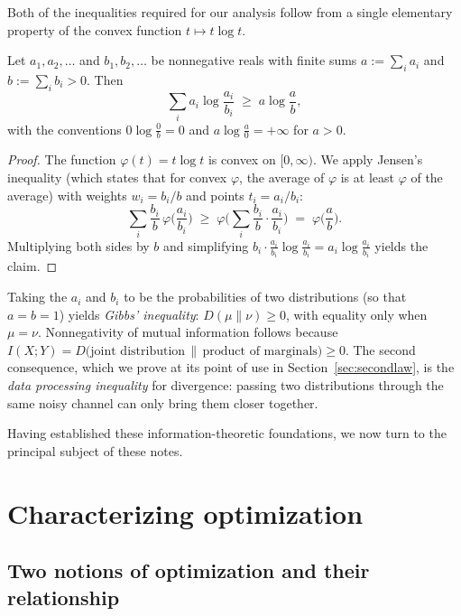 \documentclass[11pt]{article}
\begin{document}
Both of the inequalities required for our analysis follow from a single elementary property of the convex function $t \mapsto t \log t$.

\begin{lemma}
\label{lem:logsum}
Let $a_1, a_2, \dots$ and $b_1, b_2, \dots$ be nonnegative reals with finite sums $a := \sum_i a_i$ and $b := \sum_i b_i > 0$. Then
\[
\sum_i a_i \log \frac{a_i}{b_i} \;\ge\; a \log \frac{a}{b},
\]
with the conventions $0 \log \frac{0}{b} = 0$ and $a \log \frac{a}{0} = +\infty$ for $a > 0$.
\end{lemma}

\begin{proof}
The function $\varphi(t) = t \log t$ is convex on $[0, \infty)$. We apply Jensen's inequality (which states that for convex $\varphi$, the average of $\varphi$ is at least $\varphi$ of the average) with weights $w_i = b_i / b$ and points $t_i = a_i / b_i$:
\[
\sum_i \frac{b_i}{b}\, \varphi\!\Big(\frac{a_i}{b_i}\Big) \;\ge\; \varphi\!\Big(\sum_i \frac{b_i}{b} \cdot \frac{a_i}{b_i}\Big) \;=\; \varphi\!\Big(\frac{a}{b}\Big).
\]
Multiplying both sides by $b$ and simplifying $b_i \cdot \frac{a_i}{b_i}\log\frac{a_i}{b_i} = a_i \log \frac{a_i}{b_i}$ yields the claim.
\end{proof}

Taking the $a_i$ and $b_i$ to be the probabilities of two distributions (so that $a = b = 1$) yields \emph{Gibbs' inequality}: $D(\mu \| \nu) \ge 0$, with equality only when $\mu = \nu$. Nonnegativity of mutual information follows because $I(X;Y) = D\big(\text{joint distribution} \,\|\, \text{product of marginals}\big) \ge 0$. The second consequence, which we prove at its point of use in Section~\ref{sec:secondlaw}, is the \emph{data processing inequality} for divergence: passing two distributions through the same noisy channel can only bring them closer together.

Having established these information-theoretic foundations, we now turn to the principal subject of these notes.
\section{Characterizing optimization}
\label{sec:optsys}

\subsection{Two notions of optimization and their relationship}
\end{document}
